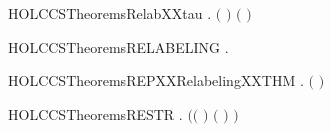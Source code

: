 \begin{SaveVerbatim}{HOLCCSTheoremsRelabXXtau}
\HOLTokenTurnstile{} \HOLSymConst{\HOLTokenForall{}} . \ensuremath{(}   \HOLSymConst{\ensuremath{=}} \HOLConst{\ensuremath{\tau}}\ensuremath{)} \HOLSymConst{\HOLTokenImp{}} \ensuremath{(} \HOLSymConst{\ensuremath{=}} \HOLConst{\ensuremath{\tau}}\ensuremath{)}
\end{SaveVerbatim}
\newcommand{\HOLCCSTheoremsRelabXXtau}{\UseVerbatim{HOLCCSTheoremsRelabXXtau}}
\begin{SaveVerbatim}{HOLCCSTheoremsRELABELING}
\HOLTokenTurnstile{} \HOLSymConst{\HOLTokenForall{}}   .  \HOLTokenTransBegin{}\HOLTokenTransEnd {} \HOLSymConst{\HOLTokenImp{}}    \HOLTokenTransBegin{}  \HOLTokenTransEnd {}  
\end{SaveVerbatim}
\newcommand{\HOLCCSTheoremsRELABELING}{\UseVerbatim{HOLCCSTheoremsRELABELING}}
\begin{SaveVerbatim}{HOLCCSTheoremsREPXXRelabelingXXTHM}
\HOLTokenTurnstile{} \HOLSymConst{\HOLTokenForall{}}.  \ensuremath{(} \ensuremath{)}
\end{SaveVerbatim}
\newcommand{\HOLCCSTheoremsREPXXRelabelingXXTHM}{\UseVerbatim{HOLCCSTheoremsREPXXRelabelingXXTHM}}
\begin{SaveVerbatim}{HOLCCSTheoremsRESTR}
\HOLTokenTurnstile{} \HOLSymConst{\HOLTokenForall{}}    .
        \HOLTokenTransBegin{}\HOLTokenTransEnd {} \HOLSymConst{\HOLTokenConj{}}
       \ensuremath{(}\ensuremath{(} \HOLSymConst{\ensuremath{=}} \HOLConst{\ensuremath{\tau}}\ensuremath{)} \HOLSymConst{\HOLTokenDisj{}} \ensuremath{(} \HOLSymConst{\ensuremath{=}}  \ensuremath{)} \HOLSymConst{\HOLTokenConj{}}  \HOLConst{\HOLTokenNotIn{}}  \HOLSymConst{\HOLTokenConj{}}   \HOLConst{\HOLTokenNotIn{}} \ensuremath{)} \HOLSymConst{\HOLTokenImp{}}
          \HOLTokenTransBegin{}\HOLTokenTransEnd {}  
\end{SaveVerbatim}
